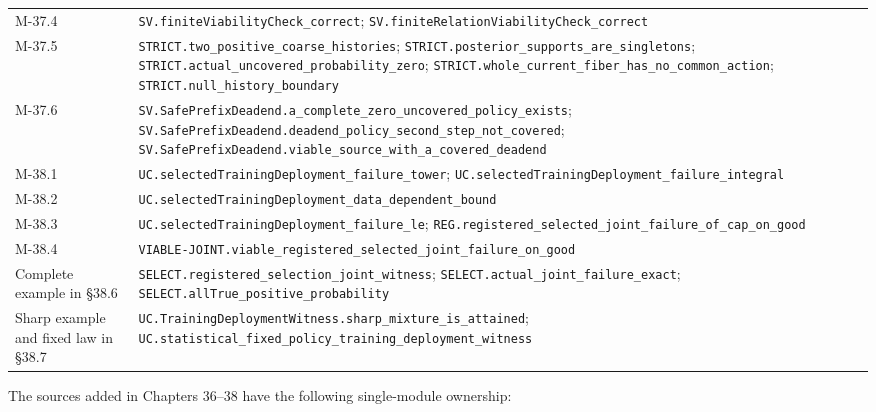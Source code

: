 \documentclass[
  english,
  11pt,
  oneside]{book}
\begin{document}
{\begin{longtable}[]{@{}
  >{\raggedright\arraybackslash}p{}
  >{\raggedright\arraybackslash}p{}@{}}
M-37.4 & \nolinkurl{SV.finiteViabilityCheck_correct}; \nolinkurl{SV.finiteRelationViabilityCheck_correct} \\
M-37.5 & \nolinkurl{STRICT.two_positive_coarse_histories}; \nolinkurl{STRICT.posterior_supports_are_singletons}; \nolinkurl{STRICT.actual_uncovered_probability_zero}; \nolinkurl{STRICT.whole_current_fiber_has_no_common_action}; \nolinkurl{STRICT.null_history_boundary} \\
M-37.6 & \nolinkurl{SV.SafePrefixDeadend.a_complete_zero_uncovered_policy_exists}; \nolinkurl{SV.SafePrefixDeadend.deadend_policy_second_step_not_covered}; \nolinkurl{SV.SafePrefixDeadend.viable_source_with_a_covered_deadend} \\
M-38.1 & \nolinkurl{UC.selectedTrainingDeployment_failure_tower}; \nolinkurl{UC.selectedTrainingDeployment_failure_integral} \\
M-38.2 & \nolinkurl{UC.selectedTrainingDeployment_data_dependent_bound} \\
M-38.3 & \nolinkurl{UC.selectedTrainingDeployment_failure_le}; \nolinkurl{REG.registered_selected_joint_failure_of_cap_on_good} \\
M-38.4 & \nolinkurl{VIABLE-JOINT.viable_registered_selected_joint_failure_on_good} \\
Complete example in §38.6 & \nolinkurl{SELECT.registered_selection_joint_witness}; \nolinkurl{SELECT.actual_joint_failure_exact}; \nolinkurl{SELECT.allTrue_positive_probability} \\
Sharp example and fixed law in §38.7 & \nolinkurl{UC.TrainingDeploymentWitness.sharp_mixture_is_attained}; \nolinkurl{UC.statistical_fixed_policy_training_deployment_witness} \\
\end{longtable}
}

The sources added in Chapters 36--38 have the following single-module ownership:
\end{document}
